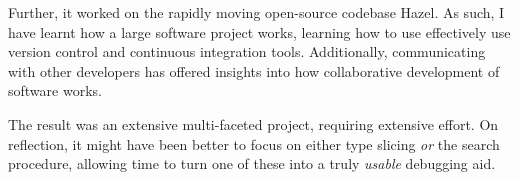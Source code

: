 Further, it worked on the rapidly moving open-source codebase Hazel. As such, I have learnt how a large software project works, learning how to use effectively use version control and continuous integration tools. Additionally, communicating with other developers has offered insights into how collaborative development of software works.

The result was an extensive multi-faceted project, requiring extensive effort. On reflection, it might have been better to focus on either type slicing \textit{or} the search procedure, allowing time to turn one of these into a truly \textit{usable} debugging aid.